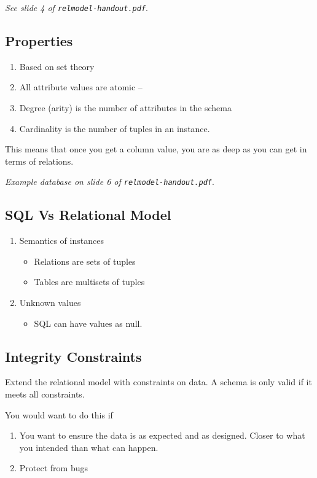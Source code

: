 \documentclass[12pt]{article}
\begin{document}
\textit{See slide 4 of \texttt{relmodel-handout.pdf}}.

\subsection{Properties}

\begin{enumerate}
    \item Based on set theory
    \item All attribute values are atomic -- 
    \item Degree (arity) is the number of attributes in the schema
    \item Cardinality is the number of tuples in an instance.
\end{enumerate}

This means that once you get a column value, you are as deep as you can get in
terms of relations.

\textit{Example database on slide 6 of \texttt{relmodel-handout.pdf}}.

\subsection{SQL Vs Relational Model}

\begin{enumerate}
    \item Semantics of instances
        \begin{itemize}
            \item Relations are sets of tuples
            \item Tables are multisets of tuples
        \end{itemize}
    \item Unknown values
        \begin{itemize}
            \item SQL can have values as null.
        \end{itemize}
\end{enumerate}

\subsection{Integrity Constraints}

Extend the relational model with constraints on data. A schema is only valid if
it meets all constraints.

You would want to do this if
\begin{enumerate}
    \item You want to ensure the data is as expected and as designed. Closer to
        what you intended than what can happen.
    \item Protect from bugs
\end{enumerate}
\end{document}
